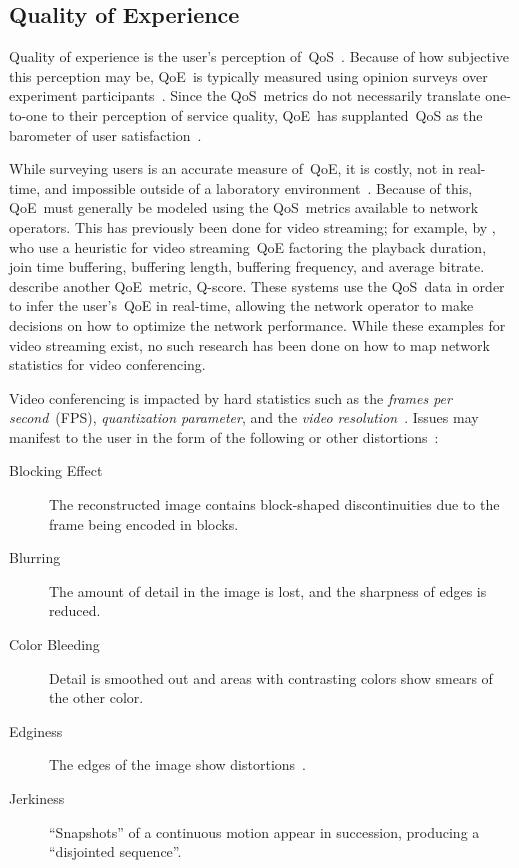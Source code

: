     \subsection{Quality of Experience}\label{introduction:qoe}
        Quality of experience is the user's perception of~QoS~\autocite{ChenYanjiao2015FQtQ}. Because of how subjective this perception may be, QoE~is typically measured using opinion surveys over experiment participants~\autocite{ChenYanjiao2015FQtQ,RodrriguezDemóstenesZ2014Vqai}. Since the QoS~metrics do not necessarily translate one-to-one to their perception of service quality, QoE~has supplanted~QoS as the barometer of user satisfaction~\autocite{DinakiHosseinEbrahimi2021FVQW}.

        While surveying users is an accurate measure of~QoE, it is costly, not in real-time, and impossible outside of a laboratory environment~\autocite{ChenYanjiao2015FQtQ,SongHan2011Qpsq}. Because of this, QoE~must generally be modeled using the QoS~metrics available to network operators. This has previously been done for video streaming; for example, by \textcite{DinakiHosseinEbrahimi2021FVQW}, who use a heuristic for video streaming~QoE factoring the playback duration, join time buffering, buffering length, buffering frequency, and average bitrate. \Textcite{SongHan2011Qpsq} describe another QoE~metric, Q-score. These systems use the QoS~data in order to infer the user's~QoE in real-time, allowing the network operator to make decisions on how to optimize the network performance. While these examples for video streaming exist, no such research has been done on how to map network statistics for video conferencing.

        Video conferencing is impacted by hard statistics such as the \emph{frames per second}~(FPS), \emph{quantization parameter}, and the \emph{video resolution}~\autocite{MacMillanKyle2021MtPa}. Issues may manifest to the user in the form of the following or other distortions~\autocite{YuenMichael1998Asoh}:

        \begin{description}
            \item[Blocking Effect] The reconstructed image contains block-shaped discontinuities due to the frame being encoded in blocks.
            \item[Blurring] The amount of detail in the image is lost, and the sharpness of edges is reduced.
            \item[Color Bleeding] Detail is smoothed out and areas with contrasting colors show smears of the other color.
            \item[Edginess] The edges of the image show distortions~\autocite{ChenYanjiao2015FQtQ}.
            \item[Jerkiness] \enquote{Snapshots} of a continuous motion appear in succession, producing a \enquote{disjointed sequence}.
        \end{description}

